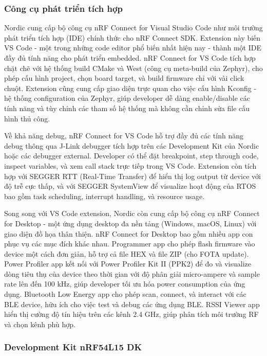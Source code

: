 \subsubsection{Công cụ phát triển tích hợp}

Nordic cung cấp bộ công cụ nRF Connect for Visual Studio Code như môi trường phát triển tích hợp (IDE) chính thức cho nRF Connect SDK. Extension này biến VS Code - một trong những code editor phổ biến nhất hiện nay - thành một IDE đầy đủ tính năng cho phát triển embedded. nRF Connect for VS Code tích hợp chặt chẽ với hệ thống build CMake và West (công cụ meta-build của Zephyr), cho phép cấu hình project, chọn board target, và build firmware chỉ với vài click chuột. Extension cũng cung cấp giao diện trực quan cho việc cấu hình Kconfig - hệ thống configuration của Zephyr, giúp developer dễ dàng enable/disable các tính năng và tùy chỉnh các tham số hệ thống mà không cần chỉnh sửa file cấu hình thủ công.

Về khả năng debug, nRF Connect for VS Code hỗ trợ đầy đủ các tính năng debug thông qua J-Link debugger tích hợp trên các Development Kit của Nordic hoặc các debugger external. Developer có thể đặt breakpoint, step through code, inspect variables, và xem call stack trực tiếp trong VS Code. Extension còn tích hợp với SEGGER RTT (Real-Time Transfer) để hiển thị log output từ device với độ trễ cực thấp, và với SEGGER SystemView để visualize hoạt động của RTOS bao gồm task scheduling, interrupt handling, và resource usage.

Song song với VS Code extension, Nordic còn cung cấp bộ công cụ nRF Connect for Desktop - một ứng dụng desktop đa nền tảng (Windows, macOS, Linux) với giao diện đồ họa thân thiện. nRF Connect for Desktop bao gồm nhiều app con phục vụ các mục đích khác nhau. Programmer app cho phép flash firmware vào device một cách đơn giản, hỗ trợ cả file HEX và file ZIP (cho FOTA update). Power Profiler app kết nối với Power Profiler Kit II (PPK2) để đo và visualize dòng tiêu thụ của device theo thời gian với độ phân giải micro-ampere và sample rate lên đến 100 kHz, giúp developer tối ưu hóa power consumption của ứng dụng. Bluetooth Low Energy app cho phép scan, connect, và interact với các BLE device, hữu ích cho việc test và debug các ứng dụng BLE. RSSI Viewer app hiển thị cường độ tín hiệu trên các kênh 2.4 GHz, giúp phân tích môi trường RF và chọn kênh phù hợp.

\subsubsection{Development Kit nRF54L15 DK}

